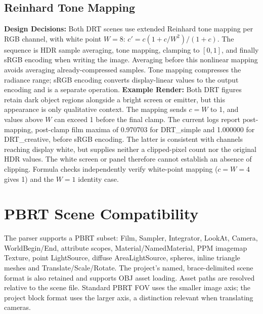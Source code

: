 \documentclass[11pt,a4paper]{article}
\begin{document}
\subsection{Reinhard Tone Mapping}
\textbf{Design Decisions:} Both DRT scenes use extended Reinhard tone mapping per RGB channel, with white point \(W=8\): \(c'=c(1+c/W^2)/(1+c)\). The sequence is HDR sample averaging, tone mapping, clamping to $[0,1]$, and finally sRGB encoding when writing the image. Averaging before this nonlinear mapping avoids averaging already-compressed samples. Tone mapping compresses the radiance range; sRGB encoding converts display-linear values to the output encoding and is a separate operation.
\textbf{Example Render:}
Both DRT figures retain dark object regions alongside a bright screen or emitter, but this appearance is only qualitative context. The mapping sends $c=W$ to 1, and values above $W$ can exceed 1 before the final clamp. The current logs report post-mapping, post-clamp film maxima of 0.970703 for DRT\_simple and 1.000000 for DRT\_creative, before sRGB encoding. The latter is consistent with channels reaching display white, but supplies neither a clipped-pixel count nor the original HDR values. The white screen or panel therefore cannot establish an absence of clipping. Formula checks independently verify white-point mapping ($c=W=4$ gives 1) and the $W=1$ identity case.


\section{PBRT Scene Compatibility}
The parser supports a PBRT subset: Film, Sampler, Integrator, LookAt, Camera, WorldBegin/End, attribute scopes, Material/NamedMaterial, PPM imagemap Texture, point LightSource, diffuse AreaLightSource, spheres, inline triangle meshes and Translate/Scale/Rotate. The project's named, brace-delimited scene format is also retained and supports OBJ asset loading. Asset paths are resolved relative to the scene file. Standard PBRT FOV uses the smaller image axis; the project block format uses the larger axis, a distinction relevant when translating cameras.
\end{document}
